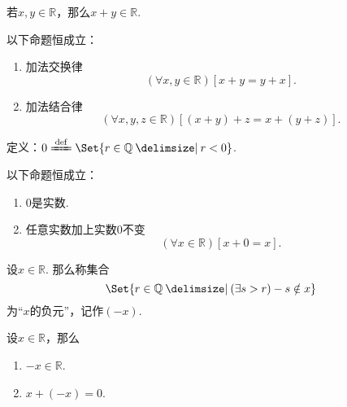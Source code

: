 \begin{lemma}
若\(x,y\in\mathbb{R}\)，那么\(x+y\in\mathbb{R}\).
\end{lemma}

\begin{theorem}
以下命题恒成立：
\begin{enumerate}
	\item 加法交换律
	\begin{equation}
		(\forall x,y\in\mathbb{R})[x+y=y+x].
	\end{equation}
	\item 加法结合律
	\begin{equation}
		(\forall x,y,z\in\mathbb{R})[(x+y)+z=x+(y+z)].
	\end{equation}
\end{enumerate}
\end{theorem}

\begin{definition}
定义：\(0\defeq\Set{ r\in\mathbb{Q} \given r<0 }\).
\end{definition}

\begin{theorem}
以下命题恒成立：
\begin{enumerate}
	\item \(0\)是实数.
	\item 任意实数加上实数\(0\)不变
	\begin{equation}
		(\forall x\in\mathbb{R})[x+0=x].
	\end{equation}
\end{enumerate}
\end{theorem}

\begin{definition}
设\(x\in\mathbb{R}\).
那么称集合\[
	\Set{ r \in \mathbb{Q} \given (\exists s>r) -s \notin x }
\]为“\(x\)的负元”，记作\((-x)\).
\end{definition}

\begin{theorem}
设\(x\in\mathbb{R}\)，那么\begin{enumerate}
	\item \(-x\in\mathbb{R}\).
	\item \(x+(-x)=0\).
\end{enumerate}
\end{theorem}

